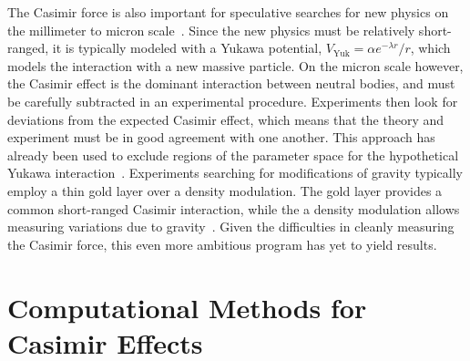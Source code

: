The Casimir force is also important for speculative searches for new physics on the millimeter to micron
scale~\cite{Dimopoulos2003, Bezerra2011}.  Since the new physics must be relatively short-ranged, 
it is typically modeled with a Yukawa potential, $V_{\text{Yuk}}=\alpha e^{-\lambda r}/r$,
which models the interaction with a new massive particle.    
On the micron scale however, the Casimir effect is the dominant interaction between neutral bodies,
 and must be carefully subtracted in an experimental procedure.
 Experiments then look for deviations from the expected Casimir effect, which means that the 
theory and experiment must be in good agreement with one another.  
This approach has already been used to exclude regions of the parameter space for the hypothetical
Yukawa interaction~\cite{Obrecht2007,Bezerra2011}.  
Experiments searching for modifications of gravity typically employ a thin gold layer over
a density modulation.  The gold layer provides a common short-ranged Casimir interaction, while the 
a density modulation allows measuring variations due to gravity~\cite{Sorrentino2009, Geraci2015}.
Given the difficulties in cleanly measuring the Casimir force, this even more ambitious program has yet 
to yield results.  



\section{Computational Methods for Casimir Effects}
\label{sec:numerical_review}

